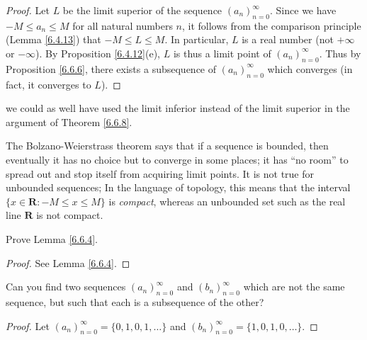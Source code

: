 \begin{proof}
Let \(L\) be the limit superior of the sequence \((a_n)_{n = 0}^\infty\).
Since we have \(-M \leq a_n \leq M\) for all natural numbers \(n\), it follows from the comparison principle (Lemma \ref{6.4.13}) that \(-M \leq L \leq M\).
In particular, \(L\) is a real number (not \(+\infty\) or \(-\infty\)).
By Proposition \ref{6.4.12}(e), \(L\) is thus a limit point of \((a_n)_{n = 0}^\infty\).
Thus by Proposition \ref{6.6.6}, there exists a subsequence of \((a_n)_{n = 0}^\infty\) which converges
(in fact, it converges to \(L\)).
\end{proof}

\begin{note}
we could as well have used the limit inferior instead of the limit superior in the argument of Theorem \ref{6.6.8}.
\end{note}

\begin{remark}\label{6.6.9}
The Bolzano-Weierstrass theorem says that if a sequence is bounded, then eventually it has no choice but to converge in some places;
it has ``no room'' to spread out and stop itself from acquiring limit points.
It is not true for unbounded sequences;
In the language of topology, this means that the interval \(\{x \in \mathbf{R} : -M \leq x \leq M\}\) is \emph{compact}, whereas an unbounded set such as the real line \(\mathbf{R}\) is not compact.
\end{remark}

\exercisesection

\begin{exercise}\label{ex 6.6.1}
Prove Lemma \ref{6.6.4}.
\end{exercise}

\begin{proof}
See Lemma \ref{6.6.4}.
\end{proof}

\begin{exercise}\label{ex 6.6.2}
Can you find two sequences \((a_n)_{n = 0}^\infty\) and \((b_n)_{n = 0}^\infty\) which are not the same sequence, but such that each is a subsequence of the other?
\end{exercise}

\begin{proof}
Let \((a_n)_{n = 0}^\infty = \{0, 1, 0, 1, \dots\}\) and \((b_n)_{n = 0}^\infty = \{1, 0, 1, 0, \dots\}\).
\end{proof}